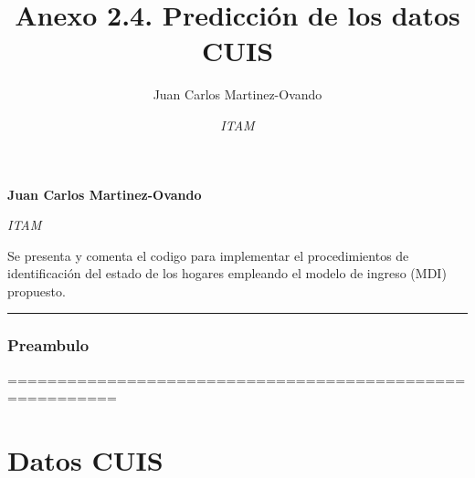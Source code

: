 \documentclass[11pt,]{article}
\title{Anexo 2.4. Predicción de los datos CUIS  }
\author{\Large Juan Carlos Martinez-Ovando\vspace{0.05in} \newline\normalsize\emph{}   \and \Large \vspace{0.05in} \newline\normalsize\emph{ITAM}  }
\date{}
\newcommand*{\authorfont}{\fontfamily{phv}\selectfont}
\renewenvironment{abstract}
 {{%
    \setlength{\leftmargin}{0mm}
    \setlength{\rightmargin}{\leftmargin}%
  }%
  \relax}
 {\endlist}
\begin{document}
	
%

{%
\setlength{\parindent}{0pt}
\thispagestyle{plain}
{\fontsize{18}{20}\selectfont\raggedright 
\maketitle  %

}

{
   \vskip 13.5pt\relax \normalsize\fontsize{11}{12} 
\textbf{\authorfont Juan Carlos Martinez-Ovando} \hskip 15pt \emph{\small }   \par \textbf{\authorfont } \hskip 15pt \emph{\small ITAM}   

}

}








\begin{abstract}

    \hbox{\vrule height .2pt width 39.14pc}

    \vskip 8.5pt %

\noindent Se presenta y comenta el codigo para implementar el procedimientos de
identificación del estado de los hogares empleando el modelo de ingreso
(MDI) propuesto.


    \hbox{\vrule height .2pt width 39.14pc}


\end{abstract}


\vskip 6.5pt


\noindent  \begin{center}\rule{0.5\linewidth}{\linethickness}\end{center}

\subsubsection{Preambulo}\label{preambulo}

=========================================================

\section{Datos CUIS}\label{datos-cuis}
\end{document}
